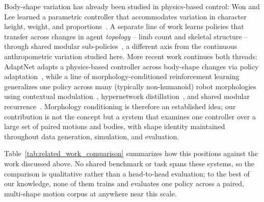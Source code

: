 Body-shape variation has already been studied in physics-based control:
Won and Lee learned a parametric controller that accommodates variation in
character height, weight, and proportions~\cite{won2019}. A separate line of
work learns policies that transfer across changes in agent \emph{topology} --
limb count and skeletal structure -- through shared modular
sub-policies~\cite{smp2020}, a different axis from the continuous
anthropometric variation studied here. More recent work continues both
threads: AdaptNet adapts a physics-based controller across body-shape
changes via policy adaptation~\cite{adaptnet}, while a line of
morphology-conditioned reinforcement learning generalizes one policy across
many (typically non-humanoid) robot morphologies using contextual
modulation~\cite{modumorph}, hypernetwork distillation~\cite{hypermorph}, and
shared modular recurrence~\cite{sharedmodular}. Morphology conditioning is
therefore an established idea; our contribution is not the concept but a
system that examines one controller over a large set of paired motions and
bodies, with shape identity maintained throughout data generation,
simulation, and evaluation.

Table~\ref{tab:related_work_comparison} summarizes how this positions against
the work discussed above. No shared benchmark or task spans these systems, so
the comparison is qualitative rather than a head-to-head evaluation; to the
best of our knowledge, none of them trains and evaluates one policy across a
paired, multi-shape motion corpus at anywhere near this scale.

